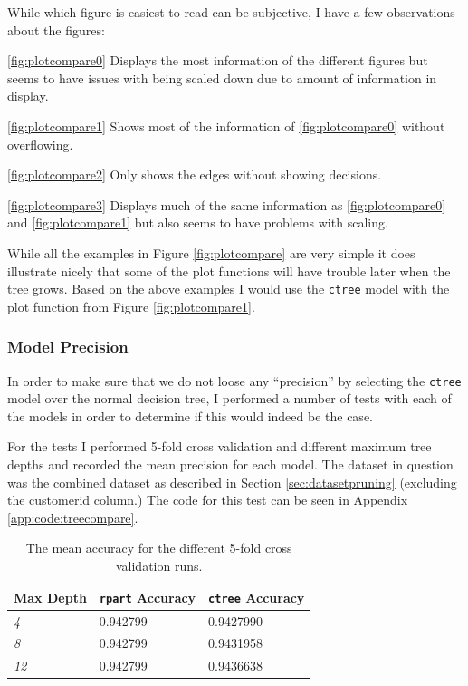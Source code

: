 While which figure is easiest to read can be subjective, I have a few
observations about the figures:
\begin{itemize*}
	\item[\ref{fig:plotcompare0}] Displays the most information of the different
		figures but seems to have issues with being scaled down due to amount of
		information in display.

	\item[\ref{fig:plotcompare1}] Shows most of the information of
	  \ref{fig:plotcompare0} without overflowing.

	\item[\ref{fig:plotcompare2}] Only shows the edges without showing decisions.

	\item[\ref{fig:plotcompare3}] Displays much of the same information as
	  \ref{fig:plotcompare0} and \ref{fig:plotcompare1} but also seems to have
	  problems with scaling.
\end{itemize*}

While all the examples in Figure \ref{fig:plotcompare} are very simple it does
illustrate nicely that some of the plot functions will have trouble later when
the tree grows. Based on the above examples I would use the \texttt{ctree} model
with the plot function from Figure \ref{fig:plotcompare1}.


\subsubsection{Model Precision}
\label{sec:treetypeprecision}

In order to make sure that we do not loose any ``precision'' by selecting the
\texttt{ctree} model over the normal decision tree, I performed a number of
tests with each of the models in order to determine if this would indeed be the
case.

For the tests I performed 5-fold cross validation and different maximum tree
depths and recorded the mean precision for each model. The dataset in question
was the combined dataset as described in Section \ref{sec:datasetpruning}
(excluding the customerid column.) The code for this test can be seen in
Appendix \ref{app:code:treecompare}.

\begin{table}[]
	\centering
	\begin{tabular}{l|l|l}
		\textbf{Max Depth} & \textbf{\texttt{rpart} Accuracy} & \textbf{\texttt{ctree} Accuracy} \\ \hline
		\textit{4}         & 0.942799                         & 0.9427990                        \\
		\textit{8}         & 0.942799                         & 0.9431958                        \\
		\textit{12}        & 0.942799                         & 0.9436638                       
	\end{tabular}
	\caption{The mean accuracy for the different 5-fold cross validation runs.}
	\label{tab:treecompare}
\end{table}

